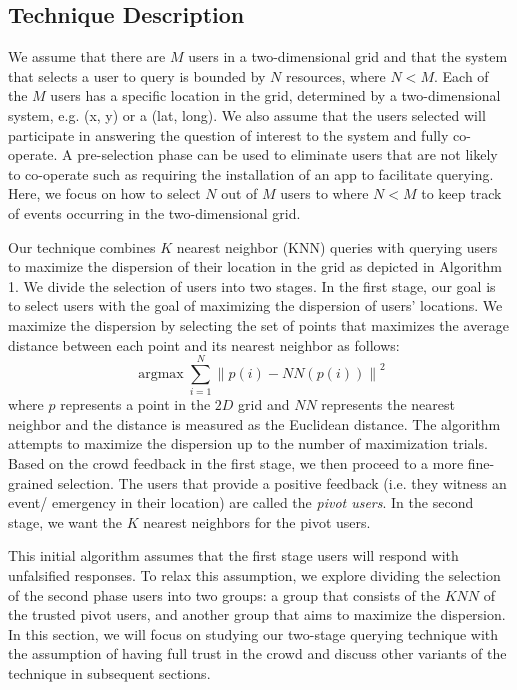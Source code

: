 \documentclass{acm_proc_article-sp}
\DeclareMathOperator*{\argmax}{argmax}
\newcommand{\norm}[1]{\left\lVert #1 \right\rVert}
\begin{document}
\subsection{Technique Description}
We assume that there are $M$ users in a two-dimensional grid and that the system that selects a user to query is bounded by $N$ resources, where $N < M$.  Each of the $M$ users has a specific location in the grid, determined by a two-dimensional system, e.g. (x, y) or a (lat, long). We also assume that the users selected will participate in answering the question of interest to the system and fully co-operate. A pre-selection phase can be used to eliminate users that are not likely to co-operate such as requiring the installation of an app to facilitate querying. Here, we focus on how to select $N$ out of $M$ users to  where $N < M$ to keep track of events occurring in the two-dimensional grid.\par
Our technique combines $K$ nearest neighbor (KNN) queries with querying users to maximize the dispersion of their location in the grid as depicted in Algorithm 1. We divide the selection of users into two stages. In the first stage, our goal is to select users with the goal of maximizing the dispersion of users' locations. We maximize the dispersion by selecting the set of points that maximizes the average distance between each point and its nearest neighbor as follows:
\begin{equation} \label{eq:maxDisp}
\argmax \sum_{i=1}^{N} \norm{p(i) - NN(p(i))}^2
\end{equation}
where $p$ represents a point in the $2D$ grid and $NN$ represents the nearest neighbor and the distance is measured as the Euclidean distance. The algorithm attempts to maximize the dispersion up to the number of maximization trials.
Based on the crowd feedback in the first stage, we then proceed to a more fine-grained selection. The users that provide a positive feedback (i.e. they witness an event/ emergency in their location) are called the \textit{pivot users}. In the second stage, we want the $K$ nearest neighbors for the pivot users. \par
This initial algorithm assumes that the first stage users will respond with unfalsified responses. To relax this assumption, we explore dividing the selection of the second phase users into two groups: a group that consists of the $KNN$ of the trusted pivot users, and another group that aims to maximize the dispersion. In this section, we will focus on studying our two-stage querying technique with the assumption of having full trust in the crowd and discuss other variants of the technique in subsequent sections.\par
\end{document}
